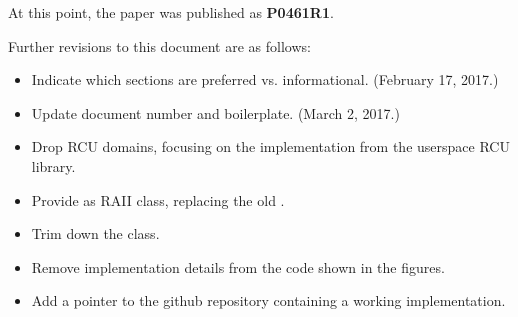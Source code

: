 \documentclass[letterpaper,10pt]{article}
\begin{document}
At this point, the paper was published as {\bf P0461R1}.

Further revisions to this document are as follows:

\begin{itemize}
\item	Indicate which sections are preferred vs. informational.
	(February 17, 2017.)
\item	Update document number and boilerplate.
	(March 2, 2017.)
\item	Drop RCU domains, focusing on the 
	implementation from the userspace RCU library.
\item	Provide  as RAII class, replacing the old
	.
\item	Trim down the  class.
\item	Remove implementation details from the code shown in
	the figures.
\item	Add a pointer to the github repository containing a
	working implementation.
\end{itemize}
\end{document}
